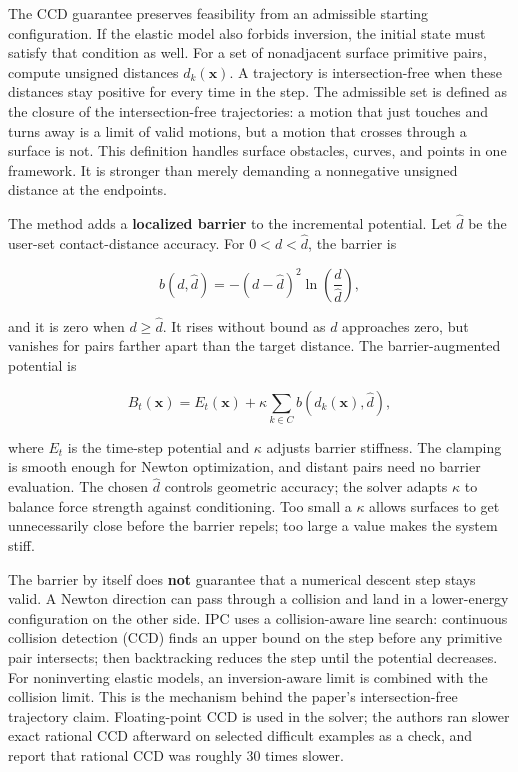 The CCD guarantee preserves feasibility from an admissible starting configuration. If the elastic model also forbids inversion, the initial state must satisfy that condition as well. For a set of nonadjacent surface primitive pairs, compute unsigned distances \(d_k(\mathbf{x})\). A trajectory is intersection-free when these distances stay positive for every time in the step. The admissible set is defined as the closure of the intersection-free trajectories: a motion that just touches and turns away is a limit of valid motions, but a motion that crosses through a surface is not. This definition handles surface obstacles, curves, and points in one framework. It is stronger than merely demanding a nonnegative unsigned distance at the endpoints.

The method adds a \textbf{localized barrier} to the incremental potential. Let \(\widehat d\) be the user-set contact-distance accuracy. For \(0<d<\widehat d\), the barrier is

\[b(d,\widehat d)=-(d-\widehat d)^2\ln\left(\frac{d}{\widehat d}\right),\]

and it is zero when \(d\ge\widehat d\). It rises without bound as \(d\) approaches zero, but vanishes for pairs farther apart than the target distance. The barrier-augmented potential is

\[B_t(\mathbf{x})=E_t(\mathbf{x})+\kappa\sum_{k\in C}b(d_k(\mathbf{x}),\widehat d),\]

where \(E_t\) is the time-step potential and \(\kappa\) adjusts barrier stiffness. The clamping is smooth enough for Newton optimization, and distant pairs need no barrier evaluation. The chosen \(\widehat d\) controls geometric accuracy; the solver adapts \(\kappa\) to balance force strength against conditioning. Too small a \(\kappa\) allows surfaces to get unnecessarily close before the barrier repels; too large a value makes the system stiff.

The barrier by itself does \textbf{not} guarantee that a numerical descent step stays valid. A Newton direction can pass through a collision and land in a lower-energy configuration on the other side. IPC uses a collision-aware line search: continuous collision detection (CCD) finds an upper bound on the step before any primitive pair intersects; then backtracking reduces the step until the potential decreases. For noninverting elastic models, an inversion-aware limit is combined with the collision limit. This is the mechanism behind the paper's intersection-free trajectory claim. Floating-point CCD is used in the solver; the authors ran slower exact rational CCD afterward on selected difficult examples as a check, and report that rational CCD was roughly 30 times slower.

